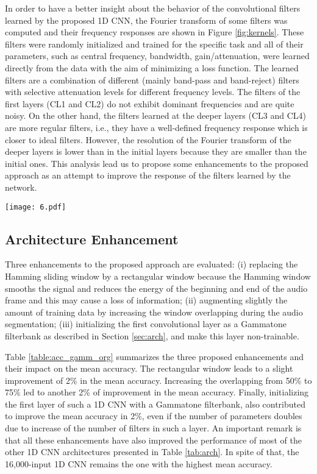 \documentclass[preprint,final,12pt]{elsarticle}
\begin{document}
In order to have a better insight about the behavior of the convolutional filters learned by the proposed 1D CNN, the Fourier transform of some filters was computed and their frequency responses are shown in Figure \ref{fig:kernels}. These filters were randomly initialized and trained for the specific task and all of their parameters, such as central frequency, bandwidth, gain/attenuation, were learned directly from the data with the aim of minimizing a loss function. The learned filters are a combination of different (mainly band-pass and band-reject) filters with selective attenuation levels for different frequency levels. The filters of the first layers (CL1 and CL2) do not exhibit dominant frequencies and are quite noisy. On the other hand, the filters learned at the deeper layers (CL3 and CL4) are more regular filters, i.e., they have a well-defined frequency response which is closer to ideal filters. However, the resolution of the Fourier transform of the deeper layers is lower than in the initial layers because they are smaller than the initial ones. This analysis lead us to propose some enhancements to the proposed approach as an attempt to improve the response of the filters learned by the network.

\begin{figure*}[htpb!]
  \centering
  \texttt{[image: 6.pdf]}
  \caption{Fourier transform of randomly selected filters from the four convolutional layers (CLs) of the proposed 16,000-input 1D CNN shown in Figure  \ref{fig:architecture}.}
  \label{fig:kernels}
\end{figure*}


\subsection{Architecture Enhancement}
\label{sec:arch_enh}
Three enhancements to the proposed approach are evaluated: (i) replacing the Hamming sliding window by a rectangular window because the Hamming window smooths the signal and reduces the energy of the beginning and end of the audio frame and this may cause a loss of information; (ii) augmenting slightly the amount of training data by increasing the window overlapping during the audio segmentation; (iii) initializing the first convolutional layer as a Gammatone filterbank as described in Section \ref{sec:arch}, and make this layer non-trainable.  

Table \ref{table:acc_gamm_org} summarizes the three proposed enhancements and their impact on the mean accuracy. The rectangular window leads to a slight improvement of 2\% in the mean accuracy. Increasing the overlapping from 50\% to 75\% led to another 2\% of improvement in the mean accuracy. Finally, initializing the first layer of such a 1D CNN with a Gammatone filterbank, also contributed to improve the mean accuracy in 2\%, even if the number of parameters doubles due to increase of the number of filters in such a layer. An important remark is that all these enhancements have also improved the performance of most of the other 1D CNN architectures presented in Table \ref{tab:arch}. In spite of that, the 16,000-input 1D CNN remains the one with the highest mean accuracy.
\end{document}
